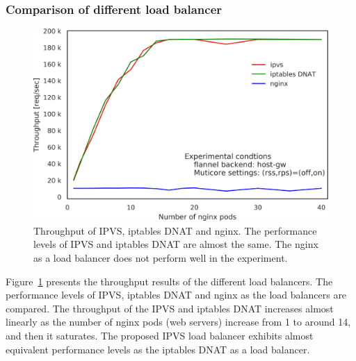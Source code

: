 \FloatBarrier

\subsubsection{Comparison of different load balancer}

\begin{figure}[h]
  \centering
  \includegraphics[width=0.75\columnwidth]{Figs/ipvs-iptables-nginx}
  \par\bigskip
  \centering
  \begin{minipage}{0.9\columnwidth}
    \caption[Throughput of IPVS, iptables DNAT and nginx]{
      Throughput of IPVS, iptables DNAT and nginx.
      The performance levels of IPVS and iptables DNAT are almost the same.
      The nginx as a load balancer does not perform well in the experiment.
    }
    \label{fig:ipvs-iptables-nginx}
  \end{minipage}
\end{figure}


Figure~\ref{fig:ipvs-iptables-nginx} presents the throughput results of the different load balancers.
The performance levels of IPVS, iptables DNAT and nginx as the load balancers are compared.
The throughput of the IPVS and iptables DNAT increases almost linearly as the number of nginx pods (web servers) increase from 1 to around 14, and then it saturates.
The proposed IPVS load balancer exhibits almost equivalent performance levels as the iptables DNAT as a load balancer.

